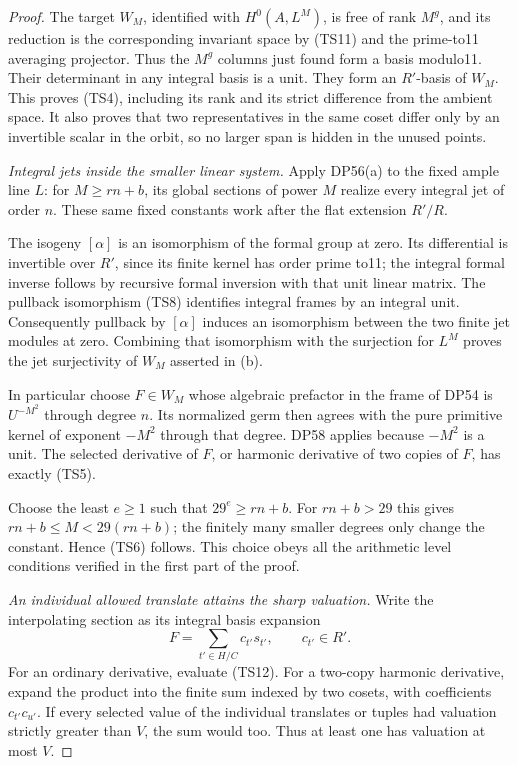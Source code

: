 \documentclass[11pt,a4paper]{article}
\theoremstyle{definition}\newtheorem{remark}[theorem]{Remark}
\begin{document}
\begin{proof}
The target \(W_M\), identified with \(H^0(A,L^M)\), is free of rank \(M^g\), and its reduction is the corresponding invariant space by (TS11) and the prime-to11 averaging projector. Thus the \(M^g\) columns just found form a basis modulo11. Their determinant in any integral basis is a unit. They form an \(R'\)-basis of \(W_M\). This proves (TS4), including its rank and its strict difference from the ambient space. It also proves that two representatives in the same coset differ only by an invertible scalar in the orbit, so no larger span is hidden in the unused points.

\emph{Integral jets inside the smaller linear system.}
Apply DP56(a) to the fixed ample line \(L\): for \(M\ge rn+b\), its global sections of power \(M\) realize every integral jet of order \(n\). These same fixed constants work after the flat extension \(R'/R\).

The isogeny \([\alpha]\) is an isomorphism of the formal group at zero. Its differential is invertible over \(R'\), since its finite kernel has order prime to11; the integral formal inverse follows by recursive formal inversion with that unit linear matrix. The pullback isomorphism (TS8) identifies integral frames by an integral unit. Consequently pullback by \([\alpha]\) induces an isomorphism between the two finite jet modules at zero. Combining that isomorphism with the surjection for \(L^M\) proves the jet surjectivity of \(W_M\) asserted in (b).

In particular choose \(F\in W_M\) whose algebraic prefactor in the frame of DP54 is \(U^{-M^2}\) through degree \(n\). Its normalized germ then agrees with the pure primitive kernel of exponent \(-M^2\) through that degree. DP58 applies because \(-M^2\) is a unit. The selected derivative of \(F\), or harmonic derivative of two copies of \(F\), has exactly (TS5).

Choose the least \(e\ge1\) such that \(29^e\ge rn+b\). For \(rn+b>29\) this gives \(rn+b\le M<29(rn+b)\); the finitely many smaller degrees only change the constant. Hence (TS6) follows. This choice obeys all the arithmetic level conditions verified in the first part of the proof.

\emph{An individual allowed translate attains the sharp valuation.}
Write the interpolating section as its integral basis expansion \[
 F=\sum_{t'\in H/C}c_{t'}s_{t'},\qquad c_{t'}\in R'.
 \tag{TS12}
\] For an ordinary derivative, evaluate (TS12). For a two-copy harmonic derivative, expand the product into the finite sum indexed by two cosets, with coefficients \(c_{t'}c_{u'}\). If every selected value of the individual translates or tuples had valuation strictly greater than \(V\), the sum would too. Thus at least one has valuation at most \(V\).


\end{proof}
\end{document}
